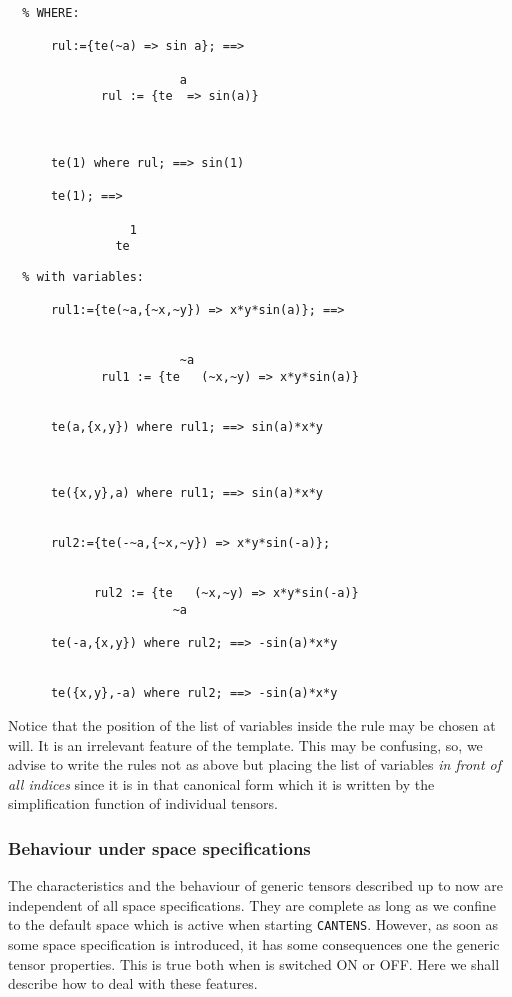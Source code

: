 \begin{verbatim}
  % WHERE:

      rul:={te(~a) => sin a}; ==>

                        a
             rul := {te  => sin(a)}



      te(1) where rul; ==> sin(1)

      te(1); ==>

                 1
               te
\end{verbatim}
\begin{verbatim}
  % with variables:

      rul1:={te(~a,{~x,~y}) => x*y*sin(a)}; ==>


                        ~a
             rul1 := {te   (~x,~y) => x*y*sin(a)}


      te(a,{x,y}) where rul1; ==> sin(a)*x*y



      te({x,y},a) where rul1; ==> sin(a)*x*y


      rul2:={te(-~a,{~x,~y}) => x*y*sin(-a)};


            rul2 := {te   (~x,~y) => x*y*sin(-a)}
                       ~a

      te(-a,{x,y}) where rul2; ==> -sin(a)*x*y


      te({x,y},-a) where rul2; ==> -sin(a)*x*y
\end{verbatim}
Notice that the position of the list of variables inside the rule
may be chosen at will. It is an irrelevant feature of the template.
This may be confusing, so, we advise to write the rules not as
above but placing the list of variables \emph{in front of all indices}
since it is in that canonical form which it is written by the simplification
function of individual tensors.

\subsubsection{Behaviour under space specifications}
The characteristics and the behaviour of generic tensors described up to now
are independent of all space specifications. They are complete as long as
we confine to the default space which is active when starting \texttt{CANTENS}.
However, as soon as some space specification is introduced, it has some
consequences one the generic tensor properties. This is true both when
 is switched ON or OFF. Here we shall describe
how to deal with these features.

